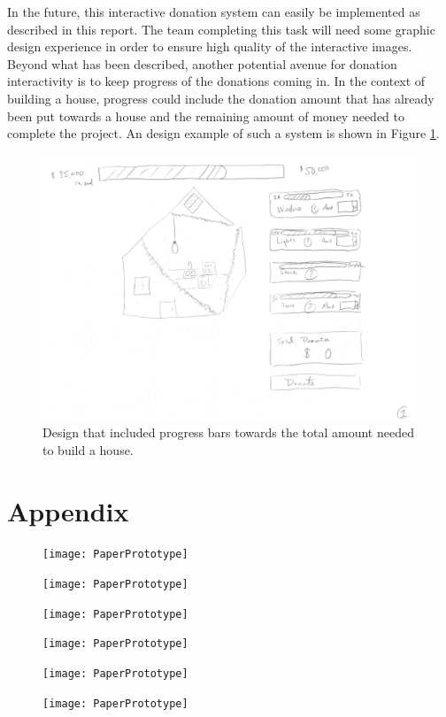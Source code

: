 \documentclass[letter]{article}
\begin{document}
In the future, this interactive donation system can easily be
implemented as described in this report. The team completing this task
will need some graphic design experience in order to ensure high
quality of the interactive images. Beyond what has been described,
another potential avenue for donation interactivity is to keep
progress of the donations coming in. In the context of building a
house, progress could include the donation amount that has already
been put towards a house and the remaining amount of money needed to
complete the project. An design example of such a system is shown in
Figure \ref{fig:5}.
\begin{figure}[H]
	\includegraphics[page=1, scale=0.5]{Example3}
	\captionsetup{justification=centering}
	\centering
	\caption{Design that included progress bars towards the total amount needed to build a house.}
	\label{fig:5}
\end{figure}
\section*{Appendix}
\begin{figure}[H]
	\texttt{[image: PaperPrototype]}
\end{figure}
\begin{figure}[H]
	\texttt{[image: PaperPrototype]}
\end{figure}
\begin{figure}[H]
	\texttt{[image: PaperPrototype]}
\end{figure}
\begin{figure}[H]
	\texttt{[image: PaperPrototype]}
\end{figure}
\begin{figure}[H]
	\texttt{[image: PaperPrototype]}
\end{figure}
\begin{figure}[H]
	\texttt{[image: PaperPrototype]}
\end{figure}
\end{document}
